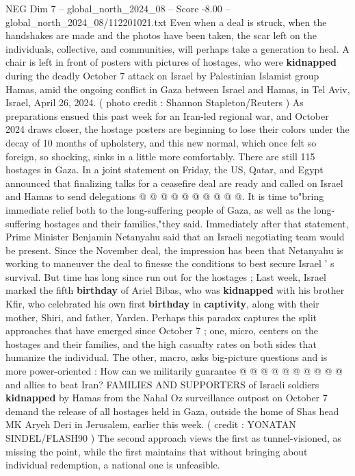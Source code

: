 \begin{textsample}{NEG Dim 7 – global\_north\_2024\_08 – Score -8.00 – global\_north\_2024\_08/112201021.txt}  \label{ex:f7_neg_086}
Even when a deal is struck, when the handshakes are made and the photos have been taken, the scar left on the individuals, collective, and communities, will perhaps take a generation to heal.
A chair is left in front of posters with pictures of hostages, who were \textbf{kidnapped} during the deadly October 7 attack on Israel by Palestinian Islamist group Hamas, amid the ongoing conflict in Gaza between Israel and Hamas, in Tel Aviv, Israel, April 26, 2024. ( photo credit : Shannon Stapleton/Reuters ) As preparations ensued this past week for an Iran-led regional war, and October 2024 draws closer, the hostage posters are beginning to lose their colors under the decay of 10 months of upholstery, and this new normal, which once felt so foreign, so shocking, sinks in a little more comfortably.
There are still 115 hostages in Gaza.
In a joint statement on Friday, the US, Qatar, and Egypt announced that finalizing talks for a ceasefire deal are ready and called on Israel and Hamas to send delegations @ @ @ @ @ @ @ @ @ @.
It is time to"bring immediate relief both to the long-suffering people of Gaza, as well as the long-suffering hostages and their families,"they said.
Immediately after that statement, Prime Minister Benjamin Netanyahu said that an Israeli negotiating team would be present.
Since the November deal, the impression has been that Netanyahu is working to maneuver the deal to finesse the conditions to best secure Israel ' s survival.
But time has long since run out for the hostages ; Last week, Israel marked the fifth \textbf{birthday} of Ariel Bibas, who was \textbf{kidnapped} with his brother Kfir, who celebrated his own first \textbf{birthday} in \textbf{captivity}, along with their mother, Shiri, and father, Yarden.
Perhaps this paradox captures the split approaches that have emerged since October 7 ; one, micro, centers on the hostages and their families, and the high casualty rates on both sides that humanize the individual.
The other, macro, asks big-picture questions and is more power-oriented : How can we militarily guarantee @ @ @ @ @ @ @ @ @ @ and allies to beat Iran?
FAMILIES AND SUPPORTERS of Israeli soldiers \textbf{kidnapped} by Hamas from the Nahal Oz surveillance outpost on October 7 demand the release of all hostages held in Gaza, outside the home of Shas head MK Aryeh Deri in Jerusalem, earlier this week. ( credit : YONATAN SINDEL/FLASH90 ) The second approach views the first as tunnel-visioned, as missing the point, while the first maintains that without bringing about individual redemption, a national one is unfeasible.

\end{textsample}
